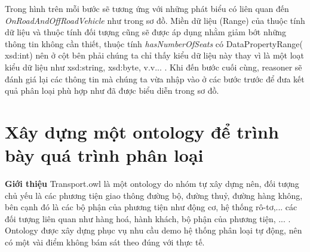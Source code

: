 Trong hình trên mỗi bước sẽ tương ứng với những phát biểu có liên quan đến \textit{OnRoadAndOffRoadVehicle} như trong sơ đồ. Miền dữ liệu (Range) của thuộc tính dữ liệu và thuộc tính đối tượng cũng sẽ được áp dụng nhằm giảm bớt những thông tin không cần thiết, thuộc tính \textit{hasNumberOfSeats} có DataPropertyRange( xsd:int) nên ở cột bên phải chúng ta chỉ thấy kiểu dữ liệu này thay vì là một loạt kiểu dữ liệu như xsd:string, xsd:byte, v.v... . Khi đến bước cuối cùng, reasoner sẽ đánh giá lại các thông tin mà chúng ta vừa nhập vào ở các bước trước để đưa kết quả phân loại phù hợp như đã được biểu diễn trong sơ đồ.

\section{Xây dựng một ontology để trình bày quá trình phân loại}
\textbf{Giới thiệu} Transport.owl là một ontology do nhóm tự xây dựng nên, đối tượng chủ yếu là các phương tiện giao thông đường bộ, đường thuỷ, đường hàng không, bên cạnh đó là các bộ phận của phương tiện như động cơ, hệ thống rô-tơ,... các đối tượng liên quan như hàng hoá, hành khách, bộ phận của phương tiện, ... .
Ontology được xây dựng phục vụ nhu cầu demo hệ thống phân loại tự động, nên có một vài điểm không bám sát theo đúng với thực tế.
